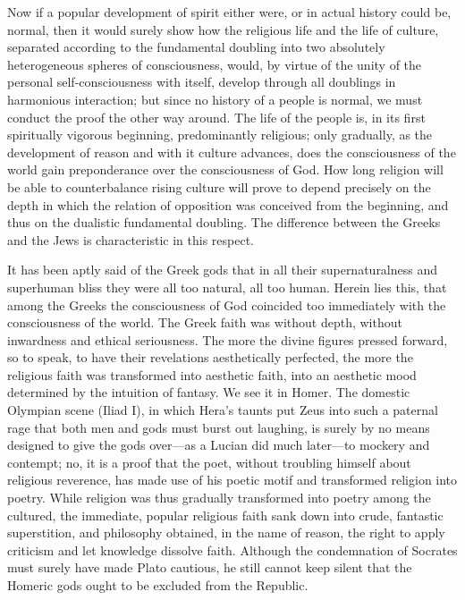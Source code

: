 \documentclass[12pt]{book}
\newcommand{\opage}[1]{\marginnote{\footnotesize\textit{[#1]}}}
\begin{document}
Now if a popular development of spirit either were, or in actual history
could be, normal, then it would surely show how the religious life and
the life of culture, separated according to the fundamental doubling
into two absolutely heterogeneous spheres of consciousness, would, by
virtue of the unity of the personal self-consciousness with itself,
develop through all doublings in harmonious interaction; but since no
history of a people is normal, we must conduct the proof the other way
around. The life of the people is, in its first spiritually vigorous
beginning, predominantly religious; only gradually, as the development
of reason and with it culture advances, does the consciousness of the
world gain preponderance over the consciousness of God. How long
religion will be able to counterbalance rising culture will prove to
depend precisely on the depth in which the relation of opposition was
conceived from the beginning, and thus on the dualistic fundamental
doubling. The difference between the Greeks and the Jews is
characteristic in this respect.

It has been aptly said of the Greek gods that in all their
supernaturalness and superhuman bliss
\opage{49}\setcounter{footnote}{0}%
they were all too natural, all too human. Herein lies this, that among
the Greeks the consciousness of God coincided too immediately with the
consciousness of the world. The Greek faith was without depth, without
inwardness and ethical seriousness. The more the divine figures pressed
forward, so to speak, to have their revelations aesthetically perfected,
the more the religious faith was transformed into aesthetic faith, into
an aesthetic mood determined by the intuition of fantasy. We see it in
Homer. The domestic Olympian scene (Iliad I), in which Hera's taunts put
Zeus into such a paternal rage that both men and gods must burst out
laughing, is surely by no means designed to give the gods over---as a
Lucian did much later---to mockery and contempt; no, it is a proof that
the poet, without troubling himself about religious reverence, has made
use of his poetic motif and transformed religion into poetry. While
religion was thus gradually transformed into poetry among the cultured,
the immediate, popular religious faith sank down into crude, fantastic
superstition, and philosophy obtained, in the name of reason, the right
to apply criticism and let knowledge dissolve faith. Although the
condemnation of Socrates must surely have made Plato cautious, he still
cannot keep silent that the Homeric gods ought to be excluded from the
Republic.
\end{document}
